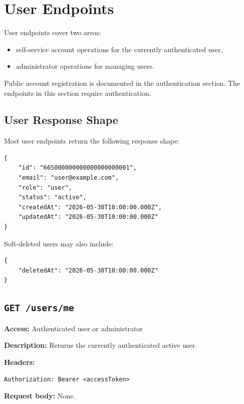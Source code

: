 \section{User Endpoints}

User endpoints cover two areas:

\begin{itemize}
    \item self-service account operations for the currently authenticated user,
    \item administrator operations for managing users.
\end{itemize}

Public account registration is documented in the authentication section. The endpoints in this section require authentication.

\subsection{User Response Shape}

Most user endpoints return the following response shape:

\begin{verbatim}
{
    "id": "665000000000000000000001",
    "email": "user@example.com",
    "role": "user",
    "status": "active",
    "createdAt": "2026-05-30T10:00:00.000Z",
    "updatedAt": "2026-05-30T10:00:00.000Z"
}
\end{verbatim}

Soft-deleted users may also include:

\begin{verbatim}
{
    "deletedAt": "2026-05-30T10:00:00.000Z"
}
\end{verbatim}

\subsection{\texttt{GET /users/me}}

\textbf{Access:} Authenticated user or administrator

\textbf{Description:} Returns the currently authenticated active user.

\textbf{Headers:}

\begin{verbatim}
Authorization: Bearer <accessToken>
\end{verbatim}

\textbf{Request body:} None.

